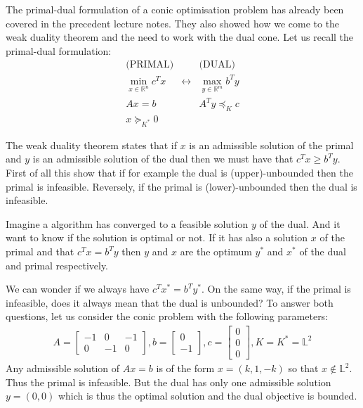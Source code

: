 The primal-dual formulation of a conic optimisation problem has already been covered in the precedent lecture notes. They also showed how we come to the weak duality theorem and the need to work with the dual cone. Let us recall the primal-dual formulation:
\begin{eqnarray*}
    \text{(PRIMAL)} & & \text{(DUAL)} \\
    \min_{x\in \mathbb{R}^n} c^T x & \longleftrightarrow & \max_{y\in\mathbb{R}^m} b^Ty \\
    Ax = b & & A^Ty \preceq_K c\\
		x \succeq_{K^*} 0 & & 
\end{eqnarray*}

The weak duality theorem states that if $x$ is an admissible solution of the primal and $y$ is an admissible solution of the dual then we must have that $c^Tx\geq b^Ty$. First of all this show that if for example the dual is (upper)-unbounded then the primal is infeasible. Reversely, if the primal is (lower)-unbounded then the dual is infeasible.

Imagine a algorithm has converged to a feasible solution $y$ of the dual. And it want to know if the solution is optimal or not. If it has also a solution $x$ of the primal and that $c^Tx=b^Ty$ then $y$ and $x$ are the optimum $y^*$ and $x^*$ of the dual and primal respectively.

We can wonder if we always have $c^Tx^* = b^Ty^*$. On the same way, if the primal is infeasible, does it always mean that the dual is unbounded? To answer both questions, let us consider the conic problem with the following parameters:
\begin{eqnarray*}
 A = \left[\begin{array}{ccc} -1 & 0 & -1 \\ 0 & -1 & 0 \end{array}\right] ,
b = \left[\begin{array}{c} 0 \\ -1 \end{array}\right] ,
c = \left[\begin{array}{c} 0 \\ 0 \\ 0 \end{array}\right] ,
K = K^* = \mathbb{L}^2
\end{eqnarray*}
Any admissible solution of $Ax=b$ is of the form $x=(k,1,-k)$ so that $x\notin \mathbb{L}^2$. Thus the primal is infeasible. But the dual has only one admissible solution $y=(0,0)$ which is thus the optimal solution and the dual objective is bounded.

